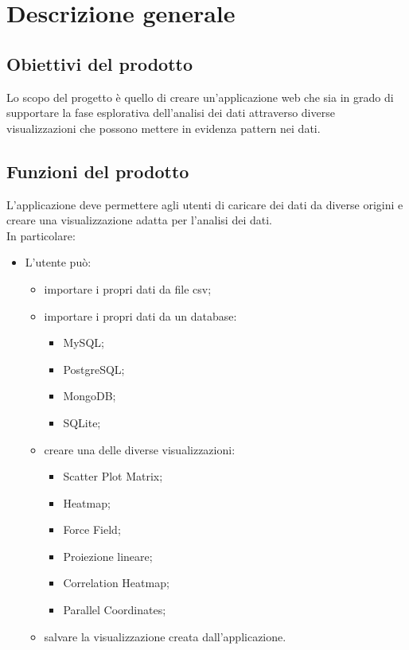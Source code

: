 \section{Descrizione generale}

\subsection{Obiettivi del prodotto}
    Lo scopo del progetto è quello di creare un'applicazione web che sia in grado di supportare la fase esplorativa dell'analisi dei dati attraverso diverse visualizzazioni che possono mettere in evidenza pattern nei dati.

\subsection{Funzioni del prodotto}
    L'applicazione deve permettere agli utenti di caricare dei dati da diverse origini e creare una visualizzazione adatta per l'analisi dei dati.
    \\
    In particolare:
    \begin{itemize}
        \item L'utente può:
        \begin{itemize}
            \item importare i propri dati da file csv;
            \item importare i propri dati da un database:
            \begin{itemize}
                \item MySQL;
                \item PostgreSQL;
                \item MongoDB;
                \item SQLite;
            \end{itemize}
            \item creare una delle diverse visualizzazioni:
            \begin{itemize}
                \item Scatter Plot Matrix;
                \item Heatmap;
                \item Force Field;
                \item Proiezione lineare;
                \item Correlation Heatmap;
                \item Parallel Coordinates;
            \end{itemize}
            \item salvare la visualizzazione creata dall'applicazione.
        \end{itemize}
    \end{itemize}
    
